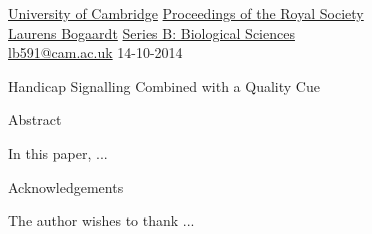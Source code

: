 \documentclass[a4paper,12pt]{article}
\numberwithin{equation}{section}
\begin{document}
\label{sec:Cover Page}

\href{http://www.cam.ac.uk}{University of Cambridge} \hfill \href{http://www.royalsocietypublishing.org}{Proceedings of the Royal Society}\\
\href{http://www.bogaardtresearch.tk}{Laurens Bogaardt} \hfill \href{http://rspb.royalsocietypublishing.org}{Series B: Biological Sciences}\\
\href{mailto:lb591@cam.ac.uk}{lb591@cam.ac.uk} \hfill 14-10-2014\\

\vspace{5cm}

\begin{center}
\begin{LARGE}
\begin{bf}
Handicap Signalling Combined with a Quality Cue
\end{bf}
\end{LARGE}
\end{center}

\vfill

\begin{center}
\begin{minipage}[t]{0.72\textwidth}
\begin{bf}
Abstract
\end{bf}
\vspace{.2cm}
\newline
In this paper, ...
\end{minipage}
\end{center}

\vspace{.6cm}

\begin{center}
\begin{minipage}[t]{0.72\textwidth}
\begin{bf}
Acknowledgements
\end{bf}
\vspace{.2cm}
\newline
The author wishes to thank ...
\end{minipage}
\end{center}

\vspace{.6cm}

\newpage


\label{sec:Contents}
\renewcommand{\contentsname}{Contents\\} 
\end{document}
